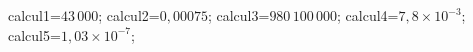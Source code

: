 \documentclass[exercice]{thedocument}%
\begin{document}
%
    \>calcul1=$43\,000$;%
    \>calcul2=$0,00075$;%
    \>calcul3=$980\,100\,000$;%
    \>calcul4=$7,8\times10^{-3}$;%
    \>calcul5=$1,03\times10^{-7}$;%
\end{document}
